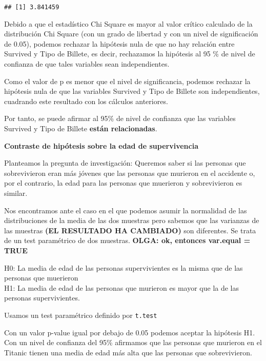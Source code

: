 \documentclass[
]{article}
\newenvironment{Shaded}{\begin{snugshade}}{\end{snugshade}}
\newcommand{\DataTypeTok}[1]{\textcolor[rgb]{0.87,0.87,0.75}{#1}}
\newcommand{\KeywordTok}[1]{\textcolor[rgb]{0.94,0.87,0.69}{#1}}
\newcommand{\NormalTok}[1]{\textcolor[rgb]{0.80,0.80,0.80}{#1}}
\newcommand{\OperatorTok}[1]{\textcolor[rgb]{0.94,0.94,0.82}{#1}}
\newcommand{\OtherTok}[1]{\textcolor[rgb]{0.94,0.94,0.56}{#1}}
\newcommand{\StringTok}[1]{\textcolor[rgb]{0.80,0.58,0.58}{#1}}
\begin{document}
\begin{verbatim}
## [1] 3.841459
\end{verbatim}

Debido a que el estadístico Chi Square es mayor al valor crítico
calculado de la distribución Chi Square (con un grado de libertad y con
un nivel de significación de 0.05), podemos rechazar la hipótesis nula
de que no hay relación entre Survived y Tipo de Billete, es decir,
rechazamos la hipótesis al 95 \% de nivel de confianza de que tales
variables sean independientes.

Como el valor de p es menor que el nivel de significancia, podemos
rechazar la hipótesis nula de que las variables Survived y Tipo de
Billete son independientes, cuadrando este resultado con los cálculos
anteriores.

Por tanto, se puede afirmar al 95\% de nivel de confianza que las
variables Survived y Tipo de Billete \textbf{están relacionadas}.

\textbf{Contraste de hipótesis sobre la edad de supervivencia}

Planteamos la pregunta de investigación: Queremos saber si las personas
que sobrevivieron eran más jóvenes que las personas que murieron en el
accidente o, por el contrario, la edad para las personas que muerieron y
sobrevivieron es similar.

Nos encontramos ante el caso en el que podemos asumir la normalidad de
las distribuciones de la media de las dos muestras pero sabemos que las
varianzas de las muestras \textbf{(EL RESULTADO HA CAMBIADO)} son
diferentes. Se trata de un test paramétrico de dos muestras.
\textbf{OLGA: ok, entonces var.equal = TRUE}

H0: La media de edad de las personas supervivientes es la misma que de
las personas que muerieron\\
H1: La media de edad de las personas que murieron es mayor que la de las
personas supervivientes.

Usamos un test paramétrico definido por \texttt{t.test}

Con un valor p-value igual por debajo de 0.05 podemos aceptar la
hipótesis H1. Con un nivel de confianza del 95\% afirmamos que las
personas que murieron en el Titanic tienen una media de edad más alta
que las personas que sobrevivieron.

\begin{Shaded}
\end{Shaded}
\end{document}
